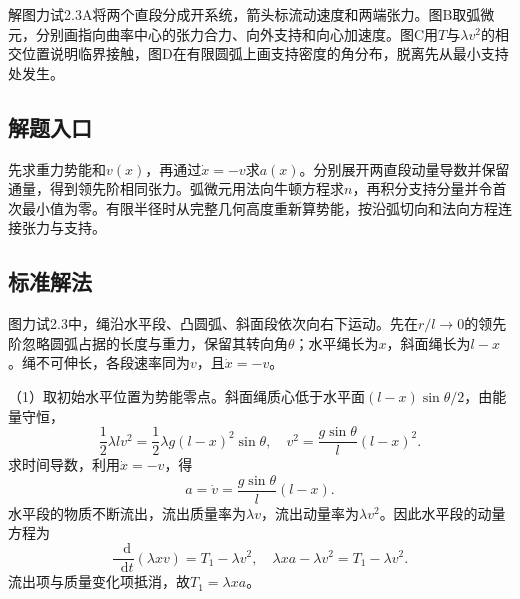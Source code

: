 \documentclass[UTF8,fontset=fandol,a4paper,11pt]{ctexart}
\newcommand{\dd}{\mathop{}\!\mathrm{d}}
\begin{document}
解图力试2.3A将两个直段分成开系统，箭头标流动速度和两端张力。图B取弧微元，分别画指向曲率中心的张力合力、向外支持和向心加速度。图C用$T$与$\lambda v^2$的相交位置说明临界接触，图D在有限圆弧上画支持密度的角分布，脱离先从最小支持处发生。



\subsection*{解题入口}

先求重力势能和$v(x)$，再通过$\dot x=-v$求$a(x)$。分别展开两直段动量导数并保留通量，得到领先阶相同张力。弧微元用法向牛顿方程求$n$，再积分支持分量并令首次最小值为零。有限半径时从完整几何高度重新算势能，按沿弧切向和法向方程连接张力与支持。



\subsection*{标准解法}


图力试2.3中，绳沿水平段、凸圆弧、斜面段依次向右下运动。先在$r/l\to0$的领先阶忽略圆弧占据的长度与重力，保留其转向角$\theta$；水平绳长为$x$，斜面绳长为$l-x$。绳不可伸长，各段速率同为$v$，且$\dot x=-v$。

（1）取初始水平位置为势能零点。斜面绳质心低于水平面$(l-x)\sin\theta/2$，由能量守恒，
\[
\frac12\lambda l v^2
=\frac12\lambda g(l-x)^2\sin\theta,
\quad
\boxed{v^2=\frac{g\sin\theta}{l}(l-x)^2}.
\]
求时间导数，利用$\dot x=-v$，得
\[
a=\dot v=\frac{g\sin\theta}{l}(l-x).
\]
水平段的物质不断流出，流出质量率为$\lambda v$，流出动量率为$\lambda v^2$。因此水平段的动量方程为
\[
\frac{\dd}{\dd t}(\lambda xv)=T_1-\lambda v^2,
\quad
\lambda xa-\lambda v^2=T_1-\lambda v^2.
\]
流出项与质量变化项抵消，故$T_1=\lambda x a$。
\end{document}
